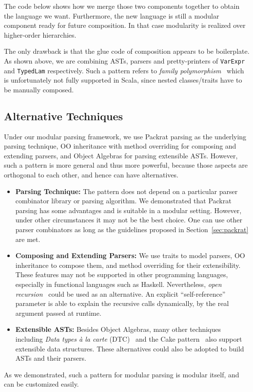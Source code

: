 The code below shows how we merge those two components together to obtain the language we want. Furthermore, the new language is still a modular
component ready for future composition. In that case modularity is realized over higher-order hierarchies.


The only drawback is that the glue code of composition appears to be
boilerplate. As shown above, we are combining ASTs, parsers and
pretty-printers of \lstinline{VarExpr} and \lstinline{TypedLam}
respectively. Such a pattern refers to \textit{family
  polymorphism}~\cite{ernst01FP} which is unfortunately not fully supported
in Scala, since nested classes/traits have to be manually composed.

\subsection{Alternative Techniques}

Under our modular parsing framework, we use Packrat parsing as the underlying parsing technique, OO inheritance with method overriding for composing and extending parsers, and Object Algebras for parsing extensible ASTs. However, such a pattern is more general and thus more powerful, because those aspects are orthogonal to each other, and hence can have alternatives.

\begin{itemize}[leftmargin=*]

\item {\bf Parsing Technique:}
The pattern does not depend on a particular parser combinator library
or parsing algorithm. We demonstrated that Packrat parsing has some
advantages and is suitable in a modular setting. However, under
other circumstances it may not be
the best choice. One can use other parser combinators as long
as the guidelines proposed in Section~\ref{sec:packrat} are met.

\item {\bf Composing and Extending Parsers:}
  We use traits to model parsers, OO inheritance to compose them, and
  method overriding for their extensibility. These features
  may not be supported in other programming languages, especially in
  functional languages such as Haskell. Nevertheless, \textit{open
    recursion}~\cite{CookThesis} could be used as an alternative. An explicit
  ``self-reference'' parameter is able to explain the recursive calls
  dynamically, by the real argument passed at runtime.

\item {\bf Extensible ASTs:}
Besides Object Algebras, many other techniques including \textit{Data
  types à la carte} (DTC)~\cite{swierstra2008data} and the Cake pattern~\cite{odersky2005independently} also support extensible data structures. These alternatives could also be adopted to build ASTs and their parsers.

\end{itemize}

As we demonstrated, such a pattern for modular parsing is 
modular itself, and can be customized easily.
